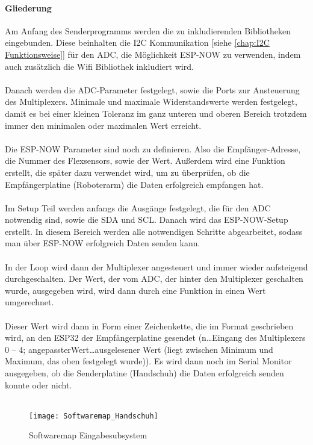 \documentclass[titlepage,12pt,twoside]{article}
\begin{document}
\paragraph{Gliederung}
\hfill \break
\hfill \break
Am Anfang des Senderprogramms werden die zu inkludierenden Bibliotheken eingebunden. Diese beinhalten die I2C Kommunikation [siehe \textcolor{blue}{\autoref{chap:I2C Funktionsweise}}] für 
den ADC, die Möglichkeit ESP-NOW zu verwenden, indem auch zusätzlich die Wifi Bibliothek inkludiert wird. \\
\\
Danach werden die ADC-Parameter festgelegt, sowie die Ports zur Ansteuerung des Multiplexers. Minimale und maximale 
Widerstandswerte werden festgelegt, damit es bei einer kleinen Toleranz im ganz unteren und oberen Bereich trotzdem immer den 
minimalen oder maximalen Wert erreicht. \\
\\
Die ESP-NOW Parameter sind noch zu definieren. Also die Empfänger-Adresse, die Nummer des Flexsensors, sowie der Wert. Außerdem 
wird eine Funktion erstellt, die später dazu verwendet wird, um zu überprüfen, ob die Empfängerplatine (Roboterarm) die Daten 
erfolgreich empfangen hat. \\
\\
Im Setup Teil werden anfangs die Ausgänge festgelegt, die für den ADC notwendig sind, sowie die SDA und SCL. Danach wird das 
ESP-NOW-Setup erstellt. In diesem Bereich werden alle notwendigen Schritte abgearbeitet, sodass man über ESP-NOW erfolgreich 
Daten senden kann. \\
\\
In der Loop wird dann der Multiplexer angesteuert und immer wieder aufsteigend durchgeschalten. Der Wert, der vom ADC, der
hinter den Multiplexer geschalten wurde, ausgegeben wird, wird dann durch eine Funktion in einen Wert umgerechnet. \\
\\
Dieser Wert wird dann in Form einer Zeichenkette, die im Format  geschrieben wird, an den ESP32 der 
Empfängerplatine gesendet (n…Eingang des Multiplexers 0 – 4; angepassterWert…ausgelesener Wert (liegt zwischen Minimum und 
Maximum, das oben festgelegt wurde)). Es wird dann noch im Serial Monitor ausgegeben, ob die Senderplatine (Handschuh) die 
Daten erfolgreich senden konnte oder nicht. \\
\\
\begin{figure}[H]
	\begin{center}
		\scalebox{1.2}
		{\texttt{[image: Softwaremap\_Handschuh]}}
		\caption{Softwaremap Eingabesubsystem}
		\label{fig:Softwaremap_Handschuh}			
	\end{center}
\end{figure}
\hfill \break
\end{document}
